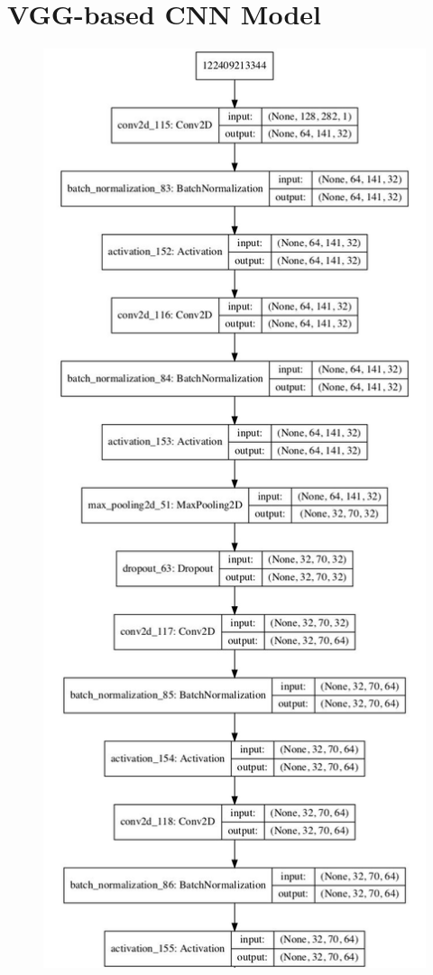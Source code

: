 \chapter{VGG-based CNN Model}
\begin{figure}[htbp]
      \centering
      \includegraphics[scale=0.35]{Figs/Appen/model_plot1.png}
\end{figure}
